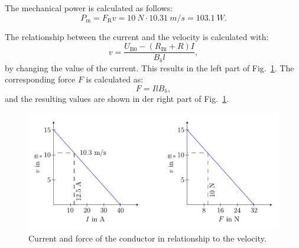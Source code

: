 
\begin{solutionblock}

    The mechanical power is calculated as follows:
    \begin{equation}
        P_{\mathrm{m}} = F_{\mathrm{R}} v
        = 10 \ \si{N} \cdot 10.31 \ \si{m/s}
        = 103.1 \ \si{W}.
    \end{equation}

    The relationship between the current and the velocity is calculated with:
    \begin{equation}
        v = \frac{U_{\mathrm{B0}}-(R_{\mathrm{Bi}}+R)I}{B_{\updelta} l},
    \end{equation}
    by changing the value of the current. This results in the left part of Fig.~\ref{fig:solution_conductorSpeed}.
    The corresponding force $F$ is calculated as:
    \begin{equation}
        F = I l B_{\updelta},
    \end{equation}
    and the resulting values are shown in der right part of Fig.~\ref{fig:solution_conductorSpeed}.
    \begin{figure}[ht]
        \centering
        \includegraphics{fig/ex01/solution_conductorSpeed.pdf}
        \caption{Current and force of the conductor in relationship to the velocity.}
        \label{fig:solution_conductorSpeed}
    \end{figure}

\end{solutionblock}



